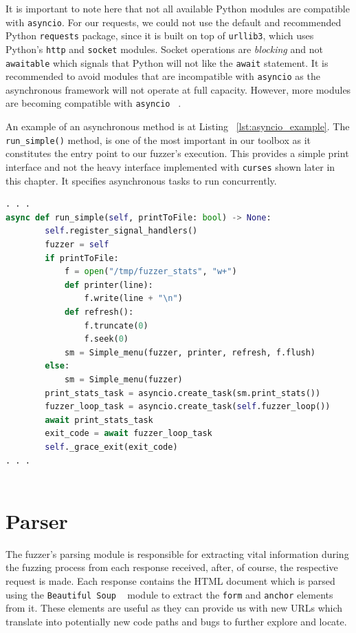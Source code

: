 It is important to note here that not all available Python modules are compatible with {\tt asyncio}. For our requests, we could not use the default and recommended Python {\tt requests} package, since it is built on top of {\tt urllib3}, which uses Python's {\tt http} and {\tt socket} modules. Socket operations are \emph{blocking} and not {\tt awaitable} which signals that Python will not like the {\tt await} statement. It is recommended to avoid modules that are incompatible with {\tt asyncio} as the asynchronous framework will not operate at full capacity. However, more modules are becoming compatible with {\tt asyncio} ~\cite{aiohttp}.

An example of an asynchronous method is at Listing ~\ref{lst:asyncio_example}. The {\tt run\_simple()} method, is one of the most important in our toolbox as it constitutes the entry point to our fuzzer's execution. This provides a simple print interface and not the heavy interface implemented with {\tt curses} shown later in this chapter. It specifies asynchronous tasks to run concurrently.

\begin{lstlisting}[aboveskip=\baselineskip, showstringspaces=false, frame=single, language=Python, columns=flexible, keepspaces=true, caption={\textit{Starting point for the fuzzer's execution using a simple print interface}}, numberstyle=\color{gray}, numbersep=5pt, label={lst:asyncio_example}]
. . . 
async def run_simple(self, printToFile: bool) -> None:
        self.register_signal_handlers()
        fuzzer = self
        if printToFile:
            f = open("/tmp/fuzzer_stats", "w+")
            def printer(line):
                f.write(line + "\n")
            def refresh():
                f.truncate(0)
                f.seek(0)
            sm = Simple_menu(fuzzer, printer, refresh, f.flush)
        else:   
            sm = Simple_menu(fuzzer)
        print_stats_task = asyncio.create_task(sm.print_stats())
        fuzzer_loop_task = asyncio.create_task(self.fuzzer_loop())
        await print_stats_task
        exit_code = await fuzzer_loop_task
        self._grace_exit(exit_code)
. . .
     
\end{lstlisting}

\section{Parser}
The fuzzer's parsing module is responsible for extracting vital information during the fuzzing process from each response received, after, of course, the respective request is made. Each response contains the HTML document which is parsed using the {\tt Beautiful Soup} ~\cite{beautiful_soup} module to extract the {\tt form} and {\tt anchor} elements from it. These elements are useful as they can provide us with new URLs which translate into potentially new code paths and bugs to further explore and locate. 

